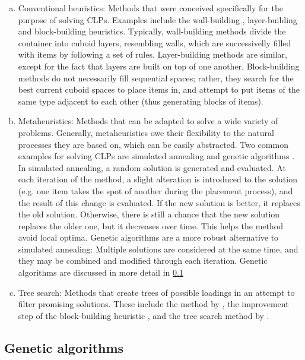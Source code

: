 \begin{enumerate}[(a)]
    \item Conventional heuristics: Methods that were conceived specifically for the purpose of solving CLPs. Examples include the wall-building \cite{GEORGE1980}, layer-building \cite{BISCHOFF1995} and block-building \cite{ELEY2002} heuristics. Typically, wall-building methods divide the container into cuboid layers, resembling walls, which are successivelly filled with items by following a set of rules. Layer-building methods are similar, except for the fact that layers are built on top of one another. Block-building methods do not necessarily fill sequential spaces; rather, they search for the best current cuboid spaces to place items in, and attempt to put items of the same type adjacent to each other (thus generating blocks of items).
    \item Metaheuristics: Methods that can be adapted to solve a wide variety of problems. Generally, metaheuristics owe their flexibility to the natural processes they are based on, which can be easily abstracted. Two common examples for solving CLPs are simulated annealing \cite{EGEBLAD2009} and genetic algorithms \cite{GONÇALVES2011}. In simulated annealing, a random solution is generated and evaluated. At each iteration of the method, a slight alteration is introduced to the solution (e.g. one item takes the spot of another during the placement process), and the result of this change is evaluated. If the new solution is better, it replaces the old solution. Otherwise, there is still a chance that the new solution replaces the older one, but it decreases over time. This helps the method avoid local optima. Genetic algorithms are a more robust alternative to simulated annealing: Multiple solutions are considered at the same time, and they may be combined and modified through each iteration. Genetic algorithms are discussed in more detail in \cref{sec:GA}
    \item Tree search: Methods that create trees of possible loadings in an attempt to filter promising solutions. These include the method by \textcite{FANSLAU2010}, the improvement step of the block-building heuristic \cite{ELEY2002}, and the tree search method by \textcite{LIU2014}.
\end{enumerate}

\subsection{Genetic algorithms}\label{sec:GA}


